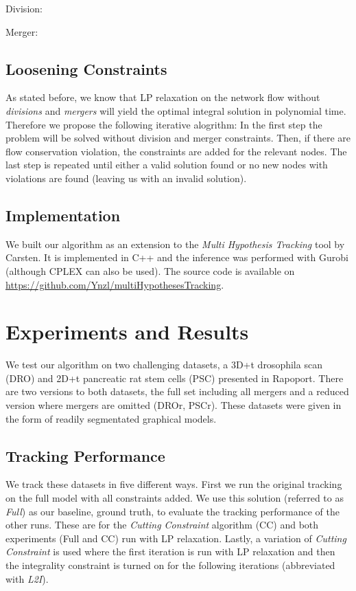 \documentclass[10pt,twocolumn,letterpaper]{article}
\begin{document}
Division:

Merger:

\subsection{Loosening Constraints}

As stated before, we know that LP relaxation on the network flow without \textit{divisions} and \textit{mergers} will yield the optimal integral solution in polynomial time. Therefore we propose the following iterative alogrithm: In the first step the problem will be solved without division and merger constraints. Then, if there are flow conservation violation, the constraints are added for the relevant nodes. The last step is repeated until either a valid solution found or no new nodes with violations are found (leaving us with an invalid solution).


\subsection{Implementation}

We built our algorithm as an extension to the \textit{Multi Hypothesis Tracking} tool by Carsten. It is implemented in C++ and the inference was performed with Gurobi (although CPLEX can also be used). The source code is available on \url{https://github.com/Ynzl/multiHypothesesTracking}.

\section{Experiments and Results}

We test our algorithm on two challenging datasets, a 3D+t drosophila scan (DRO) and 2D+t pancreatic rat stem cells (PSC) presented in Rapoport. There are two versions to both datasets, the full set including all mergers and a reduced version where mergers are omitted (DROr, PSCr). These datasets were given in the form of readily segmentated graphical models.

\subsection{Tracking Performance}

We track these datasets in five different ways. First we run the original tracking on the full model with all constraints added. We use this solution (referred to as \textit{Full}) as our baseline, \ie ground truth, to evaluate the tracking performance of the other runs. These are for the \textit{Cutting Constraint} algorithm (CC) and both experiments (Full and CC) run with LP relaxation. Lastly, a variation of \textit{Cutting Constraint} is used where the first iteration is run with LP relaxation and then the integrality constraint is turned on for the following iterations (abbreviated with \textit{L2I}).
\end{document}
